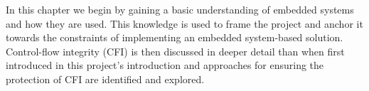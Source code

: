 In this chapter we begin by gaining a basic understanding of embedded systems and how they are used. This knowledge is used to frame the project and anchor it towards the constraints of implementing an embedded system-based solution. Control-flow integrity (CFI) is then discussed in deeper detail than when first introduced in this project's introduction and approaches for ensuring the protection of CFI are identified and explored.